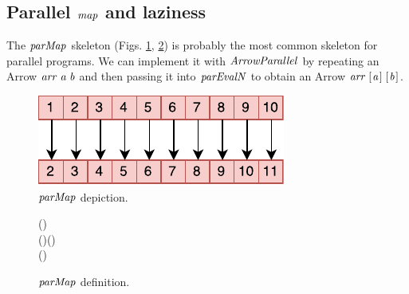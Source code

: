 \documentclass[paper=A4,twoside=true,openright,parskip=full,chapterprefix=true,headings=normal,bibliography=totoc,listof=totoc,titlepage=on,captions=tableabove,draft=false,british]{scrreprt}%
\begin{document}
\hypertarget{parallel-map-and-laziness}{%
\subsection{\texorpdfstring{Parallel \ensuremath{\Varid{map}} and
laziness}{Parallel  and laziness}}\label{parallel-map-and-laziness}}

\label{sec:parMapAndLaziness}

The \ensuremath{\Varid{parMap}} skeleton (Figs. \ref{fig:parMapImg}, \ref{fig:parMap}) is
probably the most common skeleton for parallel programs. We can
implement it with \ensuremath{\Conid{ArrowParallel}} by repeating an Arrow \ensuremath{\Varid{arr}\;\Varid{a}\;\Varid{b}} and
then passing it into \ensuremath{\Varid{parEvalN}} to obtain an Arrow \ensuremath{\Varid{arr}\;[\mskip1.5mu \Varid{a}\mskip1.5mu]\;[\mskip1.5mu \Varid{b}\mskip1.5mu]}.

\vfill

\begin{figure}[h]
\centering
\includegraphics{src/img/parMap.pdf}
\caption{\ensuremath{\Varid{parMap}} depiction.\label{fig:parMapImg}}
\end{figure}

\vfill

\begin{figure}[h]
\centering
\begin{hscode}\SaveRestoreHook
{}%
%
%
\>[B]{}\mathbin{::}(\;\;\;\;)\Rightarrow {}\<[E]%
\\
\>[B]{}\<[5]%
\>[5]{}\to (\;\;)\to (){}\<[E]%
\\
\>[B]{}\;\;\mathrel{=}\;\;(\;){}\<[E]%
\ColumnHook
\end{hscode}\resethooks
\caption{\ensuremath{\Varid{parMap}} definition.}\label{fig:parMap}\end{figure}
\end{document}

